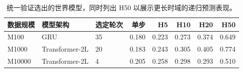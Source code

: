 
\begin{table}[H]
\centering
\caption{统一验证选出的世界模型，同时列出 H50 以展示更长时域的递归预测表现。}
\label{tab:selected_wm}
\small
\begin{tabular}{lllrrrrr}
\toprule
数据规模 & 模型架构 & 选定轮次 & 单步 & H5 & H10 & H20 & H50 \\
\midrule
M100 & GRU & 35 & 0.180 & 0.223 & 0.273 & 0.374 & 0.649 \\
M1000 & Transformer-2L & 20 & 0.183 & 0.243 & 0.305 & 0.405 & 0.774 \\
M10000 & Transformer-2L & 4 & 0.205 & 0.258 & 0.298 & 0.293 & 0.510 \\
\bottomrule
\end{tabular}
\end{table}
